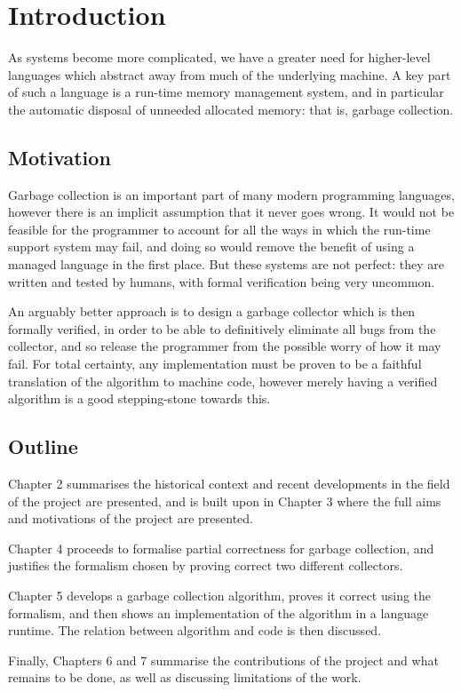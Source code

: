 \chapter{Introduction}

As systems become more complicated, we have a greater need for
higher-level languages which abstract away from much of the underlying
machine. A key part of such a language is a run-time \gls{memory
  management} system, and in particular the automatic disposal of
unneeded allocated memory: that is, \gls{garbage collection}.

\section{Motivation}

Garbage collection is an important part of many modern programming
languages, however there is an implicit assumption that it never goes
wrong. It would not be feasible for the programmer to account for all
the ways in which the run-time support system may fail, and doing so
would remove the benefit of using a managed language in the first
place. But these systems are not perfect: they are written and tested
by humans, with formal verification being very uncommon.

An arguably better approach is to design a \gls{garbage collector}
which is then formally verified, in order to be able to definitively
eliminate all bugs from the \gls{collector}, and so release the
programmer from the possible worry of how it may fail. For total
certainty, any implementation must be proven to be a faithful
translation of the algorithm to machine code, however merely having a
verified algorithm is a good stepping-stone towards this.

\section{Outline}

Chapter 2 summarises the historical context and recent developments in
the field of the project are presented, and is built upon in Chapter 3
where the full aims and motivations of the project are presented.

Chapter 4 proceeds to formalise partial correctness for
garbage collection, and justifies the formalism chosen by proving
correct two different collectors.

Chapter 5 develops a garbage collection algorithm, proves it
correct using the formalism, and then shows an implementation of the
algorithm in a language runtime. The relation between algorithm and
code is then discussed.

Finally, Chapters 6 and 7 summarise the contributions of the project
and what remains to be done, as well as discussing limitations of the
work.
